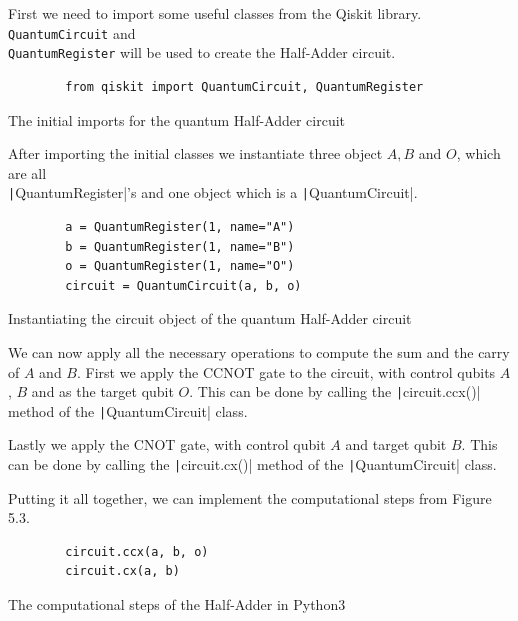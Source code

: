 First we need to import some useful classes from the Qiskit library. \texttt{QuantumCircuit} and \\
\texttt{QuantumRegister} will be used to create the Half-Adder circuit.

\begin{listing}[!ht]
    \centering
    \begin{verbatim}
        from qiskit import QuantumCircuit, QuantumRegister
    \end{verbatim}
    \caption{The initial imports for the quantum Half-Adder circuit}
\end{listing}


After importing the initial classes we instantiate three object $A, B$ and $O$, which are all \\\texttt|QuantumRegister|'s and
one object which is a \texttt|QuantumCircuit|.

\begin{listing}[!ht]
    \centering
    \begin{verbatim}
        a = QuantumRegister(1, name="A")
        b = QuantumRegister(1, name="B")
        o = QuantumRegister(1, name="O")
        circuit = QuantumCircuit(a, b, o)
    \end{verbatim}
    \caption{Instantiating the circuit object of the quantum Half-Adder circuit}
\end{listing}

We can now apply all the necessary operations to compute the sum and the carry of $A$ and $B$. First we apply the CCNOT gate to the circuit,
with control qubits $A$, $B$ and as the target qubit $O$. This can be done by calling the \texttt|circuit.ccx()| method of the
\texttt|QuantumCircuit| class.

Lastly we apply the CNOT gate, with control qubit $A$ and target qubit $B$. This can be done by calling the \texttt|circuit.cx()|
method of the \texttt|QuantumCircuit| class.

Putting it all together, we can implement the computational steps from Figure 5.3.

\begin{listing}[!ht]
    \centering
    \begin{verbatim}
        circuit.ccx(a, b, o)
        circuit.cx(a, b)
    \end{verbatim}
    \caption{The computational steps of the Half-Adder in Python3}
\end{listing}


